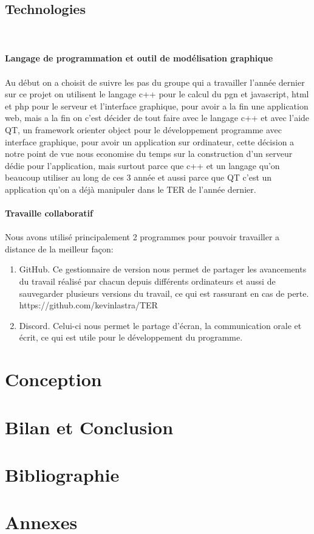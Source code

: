 \documentclass{article}
\begin{document}
\subsection{Technologies}
~\\~\\
\textbf{\large Langage de programmation et outil de modélisation graphique}
\\~\\
Au début on a choisit de suivre les pas du groupe qui a travailler l'année dernier sur ce projet on utilisent le langage c++ pour le calcul du pgn et javascript, html et php pour le serveur et l'interface graphique, pour avoir a la fin une application web, mais a la fin on c'est décider de tout faire avec le langage c++ et avec l'aide QT, un framework orienter object pour le développement programme avec interface graphique, pour avoir un application sur ordinateur, cette décision a notre point de vue nous economise du temps sur la construction d'un serveur dédie pour l'application, mais surtout parce que c++ et un langage qu'on beaucoup utiliser au long de ces 3 année et aussi parce que QT c'est un application qu'on a déjà manipuler dans le TER de l'année dernier.
~\\~\\
\textbf{\large Travaille collaboratif}
\\~\\
Nous avons utilisé principalement 2 programmes pour pouvoir travailler a distance de la meilleur façon:
\begin{enumerate}
\item GitHub. Ce gestionnaire de version nous permet de partager les avancements du travail réalisé par chacun depuis différents ordinateurs et aussi de sauvegarder plusieurs versions du travail, ce qui est rassurant en cas de perte. 
https://github.com/kevinlastra/TER
\item Discord. Celui-ci nous permet le partage d'écran, la communication orale et écrit, ce qui est utile pour le développement du programme.
\end{enumerate}
\section{Conception}
\section{Bilan et Conclusion}
\section{Bibliographie}
\section{Annexes}
\end{document}
